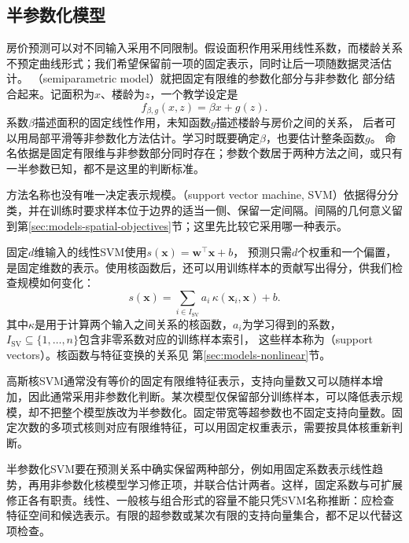 \subsection{半参数化模型}
\label{sec:models-semiparametric}

房价预测可以对不同输入采用不同限制。假设面积作用采用线性系数，而楼龄关系不预定曲线形式；我们希望保留前一项的固定表示，同时让后一项随数据灵活估计。
（semiparametric model）就把固定有限维的参数化部分与非参数化
部分结合起来。记面积为$x$、楼龄为$z$，一个教学设定是
\begin{equation}
  f_{\beta,g}(x,z)=\beta x+g(z).
  \label{eq:models-semiparametric}
\end{equation}
系数$\beta$描述面积的固定线性作用，未知函数$g$描述楼龄与房价之间的关系，
后者可以用局部平滑等非参数化方法估计。学习时既要确定$\beta$，也要估计整条函数$g$。
命名依据是固定有限维与非参数部分同时存在；参数个数居于两种方法之间，或只有一半参数已知，都不是这里的判断标准。

方法名称也没有唯一决定表示规模。（support vector machine, SVM）依据得分分类，并在训练时要求样本位于边界的适当一侧、保留一定间隔。间隔的几何意义留到第\ref{sec:models-spatial-objectives}节；这里先比较它采用哪一种表示。

固定$d$维输入的线性SVM使用$s(\bm{x})=\bm{w}^{\top}\bm{x}+b$，
预测只需$d$个权重和一个偏置，是固定维数的表示。使用核函数后，还可以用训练样本的贡献写出得分，供我们检查规模如何变化：
\begin{equation}
  s(\bm{x})=\sum_{i\in I_{\mathrm{SV}}}
    a_i\,\kappa(\bm{x}_i,\bm{x})+b.
  \label{eq:models-support-vector-expansion}
\end{equation}
其中$\kappa$是用于计算两个输入之间关系的核函数，$a_i$为学习得到的系数，
$I_{\mathrm{SV}}\subseteq\{1,\ldots,n\}$包含非零系数对应的训练样本索引，
这些样本称为（support vectors）。核函数与特征变换的关系见
第\ref{sec:models-nonlinear}节。

高斯核SVM通常没有等价的固定有限维特征表示，支持向量数又可以随样本增加，因此通常采用非参数化判断。某次模型仅保留部分训练样本，可以降低表示规模，却不把整个模型族改为半参数化。固定带宽等超参数也不固定支持向量数。固定次数的多项式核则对应有限维特征，可以用固定权重表示，需要按具体核重新判断。

半参数化SVM要在预测关系中确实保留两种部分，例如用固定系数表示线性趋势，再用非参数化核模型学习修正项，并联合估计两者。这样，固定系数与可扩展修正各有职责。线性、一般核与组合形式的容量不能只凭SVM名称推断：应检查特征空间和候选表示。有限的超参数或某次有限的支持向量集合，都不足以代替这项检查。

